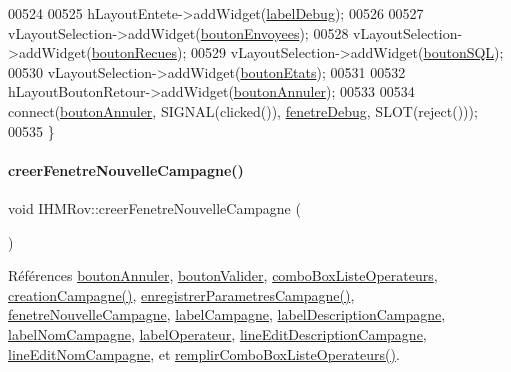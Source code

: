 \begin{DoxyCode}
00524 
00525     hLayoutEntete->addWidget(\hyperlink{class_i_h_m_rov_a667455d332d2abf2e42b897e6cc632f8}{labelDebug});
00526 
00527     vLayoutSelection->addWidget(\hyperlink{class_i_h_m_rov_a7a441ed53b0066edaf1f0acbea24e777}{boutonEnvoyees});
00528     vLayoutSelection->addWidget(\hyperlink{class_i_h_m_rov_ae56bf1c744f0fc393ef517e0e66b0d12}{boutonRecues});
00529     vLayoutSelection->addWidget(\hyperlink{class_i_h_m_rov_a5dca475dd63a04c96386855a84c5effb}{boutonSQL});
00530     vLayoutSelection->addWidget(\hyperlink{class_i_h_m_rov_a82f0ceba3dadd7a3d3251c236bf212a4}{boutonEtats});
00531 
00532     hLayoutBoutonRetour->addWidget(\hyperlink{class_i_h_m_rov_a4a6fec1b4a86c93c1d0d62d66804db5c}{boutonAnnuler});
00533 
00534     connect(\hyperlink{class_i_h_m_rov_a4a6fec1b4a86c93c1d0d62d66804db5c}{boutonAnnuler}, SIGNAL(clicked()), \hyperlink{class_i_h_m_rov_a393d23f9256a9db063dfef11d95cdc06}{fenetreDebug}, SLOT(reject()));
00535 \}
\end{DoxyCode}
\mbox{\label{class_i_h_m_rov_a08bf623a890df272f738c1ff8631213f}} 
\paragraph{\texorpdfstring{creer\+Fenetre\+Nouvelle\+Campagne()}{creerFenetreNouvelleCampagne()}}
{\footnotesize\ttfamily void I\+H\+M\+Rov\+::creer\+Fenetre\+Nouvelle\+Campagne (\begin{DoxyParamCaption}{ }\end{DoxyParamCaption})\hspace{0.3cm}{\ttfamily [private]}}



Références \hyperlink{class_i_h_m_rov_a4a6fec1b4a86c93c1d0d62d66804db5c}{bouton\+Annuler}, \hyperlink{class_i_h_m_rov_a4294b6c808089083906fb0815d1c9c27}{bouton\+Valider}, \hyperlink{class_i_h_m_rov_a32ee4423982fa3a78e59167ed2354f6e}{combo\+Box\+Liste\+Operateurs}, \hyperlink{class_i_h_m_rov_a4a4a90ab6d074aa54466f3f87db2f81c}{creation\+Campagne()}, \hyperlink{class_i_h_m_rov_a229194814bfb1fc94ab3cc86d6411921}{enregistrer\+Parametres\+Campagne()}, \hyperlink{class_i_h_m_rov_a13c12a93de7fc77c32f0108ae73cec06}{fenetre\+Nouvelle\+Campagne}, \hyperlink{class_i_h_m_rov_a3ae7bec5b8f85f779ab58ba60556b37f}{label\+Campagne}, \hyperlink{class_i_h_m_rov_addac593dfa0ea112cf4cc1b3837ca5e0}{label\+Description\+Campagne}, \hyperlink{class_i_h_m_rov_a723334735d6a20ea43f79567892cfd25}{label\+Nom\+Campagne}, \hyperlink{class_i_h_m_rov_a1855235995ed076748b568a1702355c9}{label\+Operateur}, \hyperlink{class_i_h_m_rov_aedf9fd0d893326f970aa1b73dbe06e85}{line\+Edit\+Description\+Campagne}, \hyperlink{class_i_h_m_rov_a3b3dac7166ab414832dea0b5ad1a570d}{line\+Edit\+Nom\+Campagne}, et \hyperlink{class_i_h_m_rov_a752a8dc2b3b68d536e94ff8bfb62f46f}{remplir\+Combo\+Box\+Liste\+Operateurs()}.



